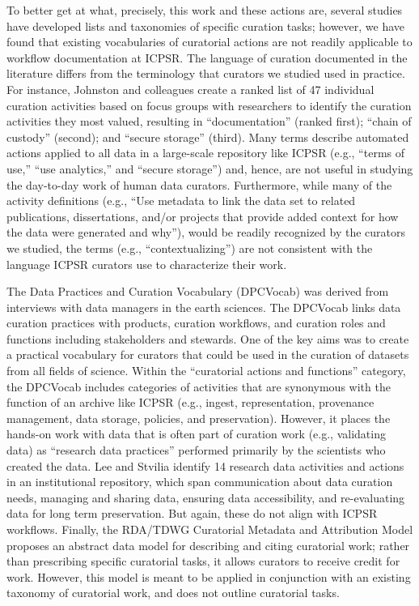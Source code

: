 \documentclass[conference]{IEEEtran}
\begin{document}
To better get at what, precisely, this work and these actions are, several studies have developed lists and taxonomies of specific curation tasks; however, we have found that existing vocabularies of curatorial actions are not readily applicable to workflow documentation at ICPSR. The language of curation documented in the literature differs from the terminology that curators we studied used in practice. For instance, Johnston and colleagues \cite{Johnston2018-gy} create a ranked list of 47 individual curation activities based on focus groups with researchers to identify the curation activities they most valued, resulting in “documentation” (ranked first); “chain of custody” (second); and “secure storage” (third). Many terms describe automated actions applied to all data in a large-scale repository like ICPSR (e.g., “terms of use,” “use analytics,” and “secure storage”) and, hence, are not useful in studying the day-to-day work of human data curators. Furthermore, while many of the activity definitions (e.g., “Use metadata to link the data set to related publications, dissertations, and/or projects that provide added context for how the data were generated and why”), would be readily recognized by the curators we studied, the terms (e.g., “contextualizing”) are not consistent with the language ICPSR curators use to characterize their work. 

The Data Practices and Curation Vocabulary (DPCVocab) \cite{Chao2015-bq} was derived from interviews with data managers in the earth sciences. The DPCVocab links data curation practices with products, curation workflows, and curation roles and functions including stakeholders and stewards. One of the key aims was to create a practical vocabulary for curators that could be used in the curation of datasets from all fields of science. Within the “curatorial actions and functions” category, the DPCVocab includes categories of activities that are synonymous with the function of an archive like ICPSR (e.g., ingest, representation, provenance management, data storage, policies, and preservation). However, it places the hands-on work with data that is often part of curation work (e.g., validating data) as “research data practices” performed primarily by the scientists who created the data. Lee and Stvilia \cite{Lee2017-be} identify 14 research data activities and actions in an institutional repository, which span communication about data curation needs, managing and sharing data, ensuring data accessibility, and re-evaluating data for long term preservation. But again, these do not align with ICPSR workflows. Finally, the RDA/TDWG Curatorial Metadata and Attribution Model \cite{Thessen2019-ay} proposes an abstract data model for describing and citing curatorial work; rather than prescribing specific curatorial tasks, it allows curators to receive credit for work. However, this model is meant to be applied in conjunction with an existing taxonomy of curatorial work, and does not outline curatorial tasks.
\end{document}
